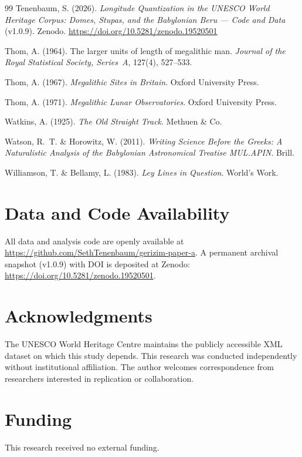 \documentclass[12pt,a4paper]{article}
\begin{document}
\begin{thebibliography}{99}
Tenenbaum, S. (2026).
\textit{Longitude Quantization in the UNESCO World Heritage Corpus: Domes, Stupas, and the Babylonian Beru --- Code and Data} (v1.0.9).
Zenodo. \url{https://doi.org/10.5281/zenodo.19520501}

Thom, A. (1964).
The larger units of length of megalithic man.
\textit{Journal of the Royal Statistical Society, Series~A}, 127(4), 527--533.

Thom, A. (1967).
\textit{Megalithic Sites in Britain}.
Oxford University Press.

Thom, A. (1971).
\textit{Megalithic Lunar Observatories}.
Oxford University Press.

Watkins, A. (1925).
\textit{The Old Straight Track}.
Methuen \& Co.

Watson, R.~T. \& Horowitz, W. (2011).
\textit{Writing Science Before the Greeks: A Naturalistic Analysis of the
Babylonian Astronomical Treatise MUL.APIN}.
Brill.

Williamson, T. \& Bellamy, L. (1983).
\textit{Ley Lines in Question}.
World's Work.

\end{thebibliography}


\section*{Data and Code Availability}
All data and analysis code are openly available at
\url{https://github.com/SethTenenbaum/gerizim-paper-a}.
A permanent archival snapshot (v1.0.9) with DOI is deposited at Zenodo:
\url{https://doi.org/10.5281/zenodo.19520501}.

\section*{Acknowledgments}
The UNESCO World Heritage Centre maintains the publicly accessible XML
dataset on which this study depends.
This research was conducted independently without institutional
affiliation. The author welcomes correspondence from researchers
interested in replication or collaboration.

\section*{Funding}
This research received no external funding.
\end{document}
